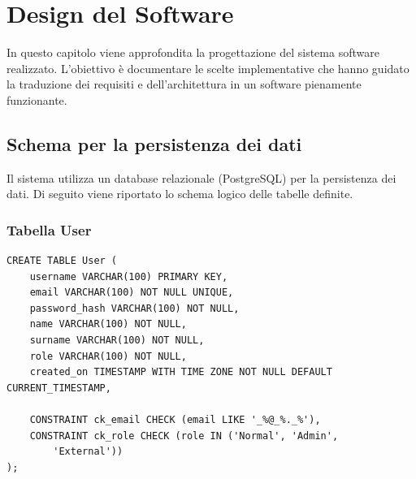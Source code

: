 \section{Design del Software}
In questo capitolo viene approfondita la progettazione del sistema software realizzato.
L'obiettivo è documentare le scelte implementative che hanno guidato la traduzione dei requisiti e dell'architettura
in un software pienamente funzionante.

\subsection{Schema per la persistenza dei dati}
Il sistema utilizza un database relazionale (PostgreSQL) per la persistenza dei dati. Di seguito viene riportato lo schema logico delle tabelle definite.


\subsubsection{Tabella User}
\noindent
\begin{minipage}{\linewidth}
\begin{lstlisting}[caption={Definizione della tabella User}]
CREATE TABLE User (
    username VARCHAR(100) PRIMARY KEY,
    email VARCHAR(100) NOT NULL UNIQUE,
    password_hash VARCHAR(100) NOT NULL,
    name VARCHAR(100) NOT NULL,
    surname VARCHAR(100) NOT NULL,
    role VARCHAR(100) NOT NULL,
    created_on TIMESTAMP WITH TIME ZONE NOT NULL DEFAULT CURRENT_TIMESTAMP,

    CONSTRAINT ck_email CHECK (email LIKE '_%@_%._%'),
    CONSTRAINT ck_role CHECK (role IN ('Normal', 'Admin', 
        'External'))
);
\end{lstlisting}
\end{minipage}

